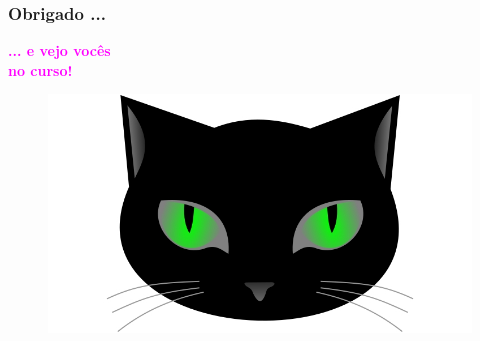 \begin{frame}[fragile]
  \frametitle{Obrigado ...}

\begin{minipage}{0.47\textwidth}
\begin{Large}
\begin{center}
\textbf{\textcolor{magenta}{... e vejo vocês\\ no curso!}}
\end{center}
\end{Large}
\end{minipage}
\begin{minipage}{0.5\textwidth}
\begin{figure}[ht!]
\begin{center}
\includegraphics[width=1.2\textwidth, height=0.40\textheight]{figures/logo_picat_alex.jpg}
\end{center}
\end{figure}
\end{minipage}



\end{frame}
						

